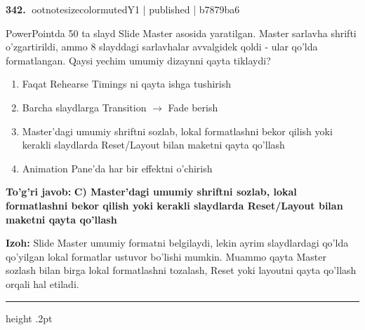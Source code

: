 \documentclass[10pt,a4paper]{article}
\begin{document}
\textbf{\color{ink}342.} {ootnotesizecolor{muted}Y1 | published | b7879ba6}
\par
PowerPointda 50 ta slayd Slide Master asosida yaratilgan. Master sarlavha shrifti o'zgartirildi, ammo 8 slayddagi sarlavhalar avvalgidek qoldi - ular qo'lda formatlangan. Qaysi yechim umumiy dizaynni qayta tiklaydi?
\begin{enumerate}[label=\Alph*),leftmargin=9mm]
\item Faqat Rehearse Timings ni qayta ishga tushirish
\item Barcha slaydlarga Transition \ensuremath{\rightarrow} Fade berish
\item Master'dagi umumiy shriftni sozlab, lokal formatlashni bekor qilish yoki kerakli slaydlarda Reset/Layout bilan maketni qayta qo'llash
\item Animation Pane'da har bir effektni o'chirish
\end{enumerate}
\begin{tcolorbox}[enhanced,breakable,colback=teal!4,colframe=teal!55!black,boxrule=0.45pt,arc=1.2mm,left=2.8mm,right=2.8mm,top=2mm,bottom=2mm]
\textbf{\color{teal}To'g'ri javob:} \textbf{C) Master'dagi umumiy shriftni sozlab, lokal formatlashni bekor qilish yoki kerakli slaydlarda Reset/Layout bilan maketni qayta qo'llash}
\par\smallskip
\textbf{Izoh:} Slide Master umumiy formatni belgilaydi, lekin ayrim slaydlardagi qo'lda qo'yilgan lokal formatlar ustuvor bo'lishi mumkin. Muammo qayta Master sozlash bilan birga lokal formatlashni tozalash, Reset yoki layoutni qayta qo'llash orqali hal etiladi.
\end{tcolorbox}
\vspace{2mm}\hrule height .2pt\vspace{2mm}
\end{document}
